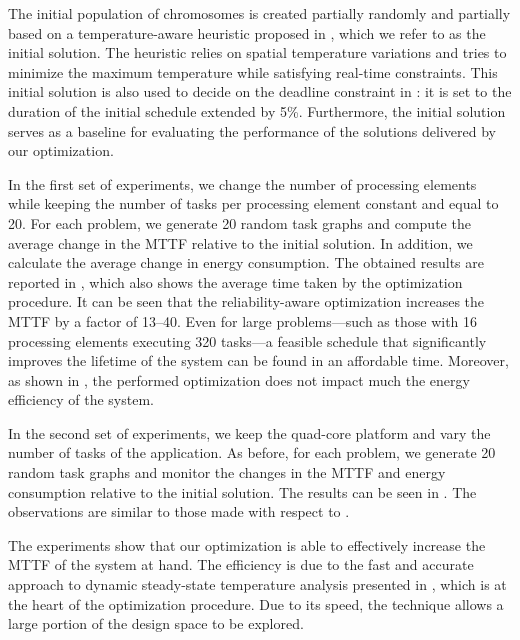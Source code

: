 The initial population of chromosomes is created partially randomly and
partially based on a temperature-aware heuristic proposed in \cite{xie2006},
which we refer to as the initial solution. The heuristic relies on spatial
temperature variations and tries to minimize the maximum temperature while
satisfying real-time constraints. This initial solution is also used to decide
on the deadline constraint \period in : it is
set to the duration of the initial schedule extended by 5\%. Furthermore, the
initial solution serves as a baseline for evaluating the performance of the
solutions delivered by our optimization.

In the first set of experiments, we change the number of processing elements \np
while keeping the number of tasks \nt per processing element constant and equal
to 20. For each problem, we generate 20 random task graphs and compute the
average change in the \ac{MTTF} relative to the initial solution. In addition,
we calculate the average change in energy consumption. The obtained results are
reported in , which also shows the average
time taken by the optimization procedure. It can be seen that the
reliability-aware optimization increases the \ac{MTTF} by a factor of 13--40.
Even for large problems---such as those with 16 processing elements executing
320 tasks---a feasible schedule that significantly improves the lifetime of the
system can be found in an affordable time. Moreover, as shown in
, the performed optimization does not impact
much the energy efficiency of the system.

In the second set of experiments, we keep the quad-core platform and vary the
number of tasks \nt of the application. As before, for each problem, we generate
20 random task graphs and monitor the changes in the \ac{MTTF} and energy
consumption relative to the initial solution. The results can be seen in
. The observations are similar to those made with
respect to .

The experiments show that our optimization is able to effectively increase the
\ac{MTTF} of the system at hand. The efficiency is due to the fast and accurate
approach to dynamic steady-state temperature analysis presented in
, which is at the heart of the optimization
procedure. Due to its speed, the technique allows a large portion of the design
space to be explored.

